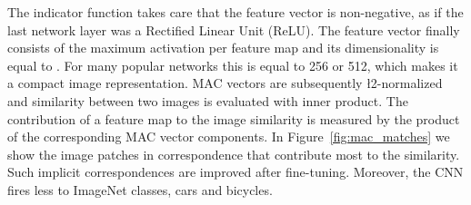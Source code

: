 \documentclass[runningheads]{llncs}
\begin{document}
\noindent
The indicator function  takes care that the feature vector  is non-negative, as if the last network layer was a Rectified Linear Unit (ReLU).
The feature vector finally consists of the maximum activation per feature map and its dimensionality  is equal to .
For many popular networks this is equal to 256 or 512, which makes it a compact image representation.
MAC vectors are subsequently \l2-normalized and similarity between two images is evaluated with inner product. 
The contribution of a feature map to the image similarity is measured by the product of the corresponding MAC vector components. 
In Figure~\ref{fig:mac_matches} we show the image patches in correspondence that contribute most to the similarity. 
Such implicit correspondences are improved after fine-tuning. Moreover, the CNN fires less to ImageNet classes, \eg cars and bicycles. 
\begin{figure}[t]
\centering

\def\queryone{11}
\def\dbimageone{3885}
\def\querytwo{42}
\def\dbimagetwo{211}


\end{figure}
\end{document}
